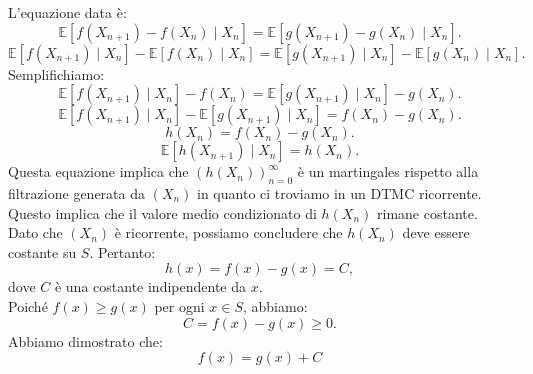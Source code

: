 \documentclass[a4paper,12pt]{article}
\begin{document}
\begin{itemize}
		L'equazione data è:
		\[
		\mathbb{E}[f(X_{n+1}) - f(X_n) \mid X_n] = \mathbb{E}[g(X_{n+1}) - g(X_n) \mid X_n].
		\]
		\[
		\mathbb{E}[f(X_{n+1}) \mid X_n] - \mathbb{E}[f(X_n) \mid X_n]  = \mathbb{E}[g(X_{n+1}) \mid X_n] - \mathbb{E}[g(X_n) \mid X_n] .
		\]
		Semplifichiamo:
		\[
		\mathbb{E}[f(X_{n+1}) \mid X_n] - f(X_n) = \mathbb{E}[g(X_{n+1}) \mid X_n] - g(X_n).
		\]
		\[
		\mathbb{E}[f(X_{n+1}) \mid X_n] - \mathbb{E}[g(X_{n+1}) \mid X_n] = f(X_n) - g(X_n).
		\]
		\[
		h(X_n) = f(X_n) - g(X_n).
		\]
		\[
		\mathbb{E}[h(X_{n+1}) \mid X_n] = h(X_n).
		\]
		Questa equazione implica che $\left(h(X_n)\right)_{n=0}^\infty$ è un martingales rispetto alla filtrazione generata da $(X_n)$ in quanto ci troviamo in un DTMC ricorrente. Questo implica che il valore medio condizionato di $h(X_n)$ rimane costante.\\
		Dato che $(X_n)$ è ricorrente, possiamo concludere che $h(X_n)$ deve essere costante su $S$. Pertanto:
		$$
		h(x) = f(x) - g(x) = C,
		$$
		dove $C$ è una costante indipendente da $x$.\\
		Poiché $f(x) \geq g(x)$ per ogni $x \in S$, abbiamo:
		$$
		C = f(x) - g(x) \geq 0.
		$$
		Abbiamo dimostrato che:
		\[
		f(x)=g(x)+C
		\]
	
		
	\end{itemize}
\end{document}
